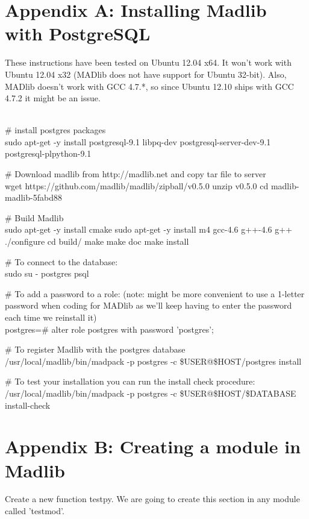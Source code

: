 
\section*{Appendix A: Installing Madlib with PostgreSQL}


These instructions have been tested on Ubuntu 12.04 x64. It won't work with Ubuntu 12.04 x32 (MADlib does not have support for Ubuntu 32-bit). Also, MADlib doesn't work with GCC 4.7.*, so since Ubuntu 12.10 ships with GCC 4.7.2 it might be an issue.

~~\\
\# install postgres packages \\
sudo apt-get -y install postgresql-9.1 libpq-dev postgresql-server-dev-9.1 postgresql-plpython-9.1

\# Download madlib from http://madlib.net and copy tar file to server \\
wget https://github.com/madlib/madlib/zipball/v0.5.0
unzip v0.5.0
cd madlib-madlib-5fabd88 

\# Build Madlib \\
sudo apt-get -y install cmake
sudo apt-get -y install m4 gcc-4.6 g++-4.6 g++
./configure
cd build/
make
make doc
make install

\# To connect to the database: \\
sudo su - postgres
psql

\# To add a password to a role: (note: might be more convenient to use a 1-letter password when coding for MADlib as we'll keep having to enter the password each time we reinstall it) \\
postgres=\# alter role postgres with password 'postgres';

\# To register Madlib with the postgres database \\
/usr/local/madlib/bin/madpack -p postgres -c \$USER@\$HOST/postgres install

\# To test your installation you can run the install check procedure: \\
/usr/local/madlib/bin/madpack -p postgres -c \$USER@\$HOST/\$DATABASE install-check


\section*{Appendix B: Creating a module in Madlib}

Create a new function testpy. We are going to create this section in any module called 'testmod'.

